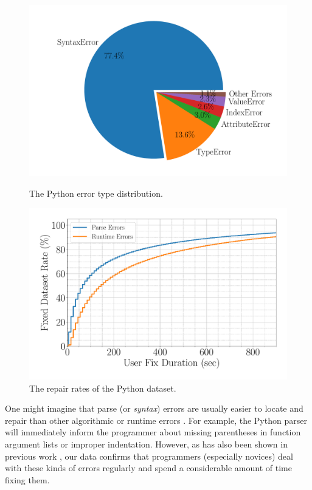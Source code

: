 \begin{figure}[t]
  \centering
  \begin{minipage}[c]{0.50\linewidth}
    \centering
    \includegraphics[width=\linewidth]{error-pie.pdf}
    \caption{The Python error type distribution.}
    \label{fig:error-statistics}
  \end{minipage}
  \begin{minipage}[c]{0.49\linewidth}
      \centering
      \includegraphics[width=\linewidth]{fixed-rate.pdf}
      \caption{The repair rates of the Python dataset.}
      \label{fig:repair-rate}
  \end{minipage}
\end{figure}

One might imagine that parse (or \emph{syntax}) errors are
usually easier to locate and repair than other algorithmic
or runtime errors \citep{Denny_2012}.
%
For example, the Python parser will immediately inform the programmer
about missing parentheses in function argument lists or improper
indentation.
%
However, as has also been shown in previous
work \citep{Ahadi_2018, Kummerfeld2003}, our
data confirms that programmers (especially novices)
deal with these kinds of errors regularly and
spend a considerable amount of time fixing them.

